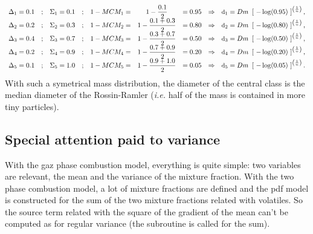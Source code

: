 \begin{equation*}
\begin{array}{r c l c l c l c l}
\Delta_{1} = 0.1 &;& \Sigma_{1} = 0.1 &;& 1-MCM_{1}= &1-\dfrac{0.1}{2}&=0.95 &\Rightarrow&
           \mbox{\small d}_1 = Dm ~ \left[~ -\log(0.95) ~\right]^{\left(\frac{1}{n}\right)}, \\
\Delta_{2} = 0.2 &;& \Sigma_{2} = 0.3 &;& 1-MCM_{2}= &1-\dfrac{0.1+0.3}{2}&= 0.80 &\Rightarrow& 
           \mbox{\small d}_2 = Dm ~ \left[~ -\log(0.80) ~\right]^{\left(\frac{1}{n}\right)}, \\
\Delta_{3} = 0.4 &;& \Sigma_{3} = 0.7 &;& 1-MCM_{3}= &1-\dfrac{0.3+0.7}{2}&= 0.50 &\Rightarrow& 
           \mbox{\small d}_3 = Dm ~ \left[~ -\log(0.50) ~\right]^{\left(\frac{1}{n}\right)}, \\
\Delta_{4} = 0.2 &;& \Sigma_{4} = 0.9 &;& 1-MCM_{4}= &1-\dfrac{0.7+0.9}{2}&= 0.20 &\Rightarrow& 
           \mbox{\small d}_4 = Dm ~ \left[~ -\log(0.20) ~\right]^{\left( \frac{1}{n}\right)}, \\
\Delta_{5} = 0.1 &;& \Sigma_{5} = 1.0 &;& 1-MCM_{5}= &1-\dfrac{0.9+1.0}{2}&= 0.05 &\Rightarrow& 
           \mbox{\small d}_5 = Dm ~ \left[~ -\log(0.05) ~\right]^{\left(\frac{1}{n}\right)} .
\end{array} 
\end{equation*}
With such a symetrical mass distribution, the diameter of the central class is the median diameter of the Rossin-Ramler (\emph{i.e.} half of the mass is contained in more tiny particles).

\subsection{Special attention paid to variance}

With the gaz phase combustion model, everything is quite simple: two variables
are relevant, the mean and the variance of the mixture fraction. With the two
phase combustion model, a lot of mixture fractions are defined and the pdf model
is constructed for the sum of the two mixture fractions related with
volatiles. So the source term related with the square of the gradient of the
mean can't be computed as for regular variance (the  subroutine is
called for the sum).

